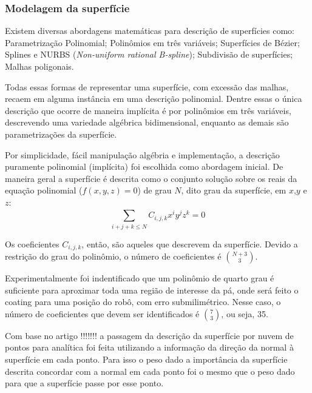 \subsubsection{Modelagem da superfície}\label{modelagem}

%





Existem diversas abordagens matemáticas para descrição de superfícies como:
Parametrização Polinomial; Polinômios em três variáveis; Superfícies de
Bézier; Splines e NURBS (\textit{Non-uniform rational B-spline}); Subdivisão de
superfícies; Malhas poligonais.

Todas essas formas de representar uma superfície, com excessão das malhas,
recaem em alguma instância em uma descrição polinomial. Dentre essas o única
descrição que ocorre de maneira implícita é por polinômios em três variáveis,
descrevendo uma variedade algébrica bidimensional, enquanto as demais são
parametrizações da superfície. 

Por simplicidade, fácil manipulação algébria e implementação, a descrição
puramente polinomial (implícita) foi escolhida como abordagem inicial. De
maneira geral a superfície é descrita como o conjunto solução sobre os
reais da equação polinomial ($f(x,y,z)=0$) de grau $N$, dito grau da
superfície, em $x$,$y$ e $z$:
\[\sum\limits_{i+j+k \leq N}^{} C_{i,j,k}x^iy^jz^k = 0\]

Os coeficientes $C_{i,j,k}$, então, são aqueles que descrevem da superfície.
Devido a restrição do grau do polinômio, o número de coeficientes é
$\binom{N+3}{3}$.

Experimentalmente foi indentificado que um polinômio de quarto grau é suficiente
para aproximar toda uma região de interesse da pá, onde será feito o coating
para uma posição do robô, com erro submilimétrico. Nesse caso, o número de
coeficientes que devem ser identificados é $\binom{7}{3}$, ou seja, 35.

Com base no artigo !!!!!!! a passagem da descrição da superfície por nuvem de
pontos para analítica foi feita utilizando a informação da direção da normal à
superfície em cada ponto. Para isso o peso dado a importância da superfície
descrita concordar com a normal em cada ponto foi o mesmo que o peso dado para
que a superfície passe por esse ponto.

